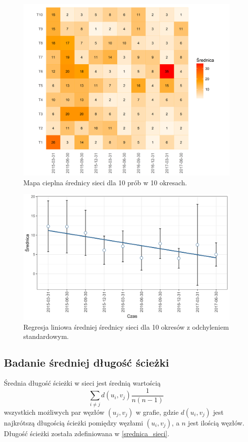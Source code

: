 \documentclass[12pt, twoside, final, openany]{mgr}
\newcommand{\chartsWidth}{0.8}
\begin{document}
\begin{figure}[H]
\centering
  \includegraphics[width=\chartsWidth\linewidth]{pictures/srednica/srednica_hm.png}
  \caption{Mapa cieplna średnicy sieci dla 10 prób w 10 okresach.}
  \label{fig:s1} 
\end{figure}
\begin{figure}[H]
\centering
  \includegraphics[width=\chartsWidth\linewidth]{pictures/srednica/srednica_sda.png}
  \caption{Regresja liniowa średniej średnicy sieci dla 10 okresów z odchyleniem standardowym.}
  \label{fig:s2}
\end{figure}


\subsection{Badanie średniej długość ścieżki}
\label{dlugosc_sciezki}
\indent Średnia długość ścieżki w sieci jest średnią wartością 
\begin{equation}
\label{eq:dlugosc_sciezki}
	\sum_{i \ne j}^{} d(u_i,v_j)\frac{1}{n(n-1)}
\end{equation}
wszystkich możliwych par węzłów $(u_j,v_j)$ w grafie, gdzie $d(u_i,v_j)$ jest najkrótszą długością ścieżki pomiędzy węzłami $(u_i,v_j)$, a $n$ jest ilością węzłów. Długość ścieżki została zdefiniowana w \ref{srednica_sieci}. 
\end{document}
